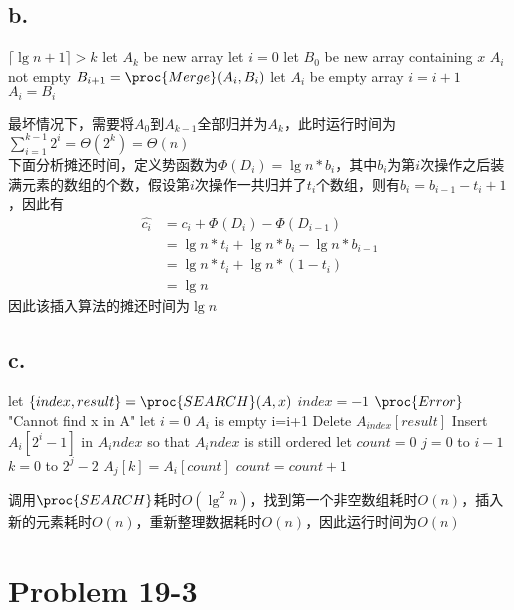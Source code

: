 \documentclass{article}
\begin{document}
  		\subsection*{b.}
  			\begin{codebox}
  				\li \If $\lceil\lg{n+1}\rceil > k$
  				\li \Then let $A_{k}$ be new array
  				\End
  				\li let $i=0$
  				\li let $B_0$ be new array containing $x$
  				\li \While $A_i$ not empty
  				\li \Do $B_{i+1}=\proc{Merge}(A_i,B_i)$
  				\li let $A_i$ be empty array
  				\li $i=i+1$
  				\End
  				\li $A_i=B_i$
  			\end{codebox}
  			最坏情况下，需要将$A_0$到$A_{k-1}$全部归并为$A_k$，此时运行时间为$\sum_{i=1}^{k-1}2^i=\Theta(2^k)=\Theta(n)$ \\
  			下面分析摊还时间，定义势函数为$\Phi(D_i)=\lg{n}*b_i$，其中$b_i$为第$i$次操作之后装满元素的数组的个数，假设第$i$次操作一共归并了$t_i$个数组，则有$b_i=b_{i-1}-t_i+1$，因此有
  			\begin{align*}
	  			\hat{c_i} &= c_i+\Phi(D_i)-\Phi(D_{i-1}) \\
	  			&= \lg{n}*t_i + \lg{n}*b_i-\lg{n}*b_{i-1} \\
	  			&= \lg{n}*t_i+\lg{n}*(1-t_i) \\
	  			&= \lg{n}
  			\end{align*}
  			因此该插入算法的摊还时间为$\lg{n}$
  		\subsection*{c.}
  			\begin{codebox}
  				\Procname{\proc{DELETE}(A,x)}
  				\li let $\{index,result\}=\proc{SEARCH}(A,x)$
  				\li \If $index=-1$
  				\li \Then $\proc{Error}$ "Cannot find x in A"
  				\End
  				\li let $i=0$
  				\li \While $A_i$ is empty
  				\li \Do i=i+1
  				\End
  				\li Delete $A_{index}[result]$
  				\li Insert $A_i[2^i-1]$ in $A_index$ so that $A_index$ is still ordered
  				\li let $count=0$
  				\li \For $j=0$ to $i-1$
  				\li \Then \For $k=0$ to $2^j-2$
  				\li \Then $A_j[k]=A_i[count]$
  				\li $count=count+1$
  				\End
  				\End
  			\end{codebox}
  			调用$\proc{SEARCH}$耗时$O(\lg^2{n})$，找到第一个非空数组耗时$O(n)$，插入新的元素耗时$O(n)$，重新整理数据耗时$O(n)$，因此运行时间为$O(n)$
  	\section*{Problem 19-3}
\end{document}
